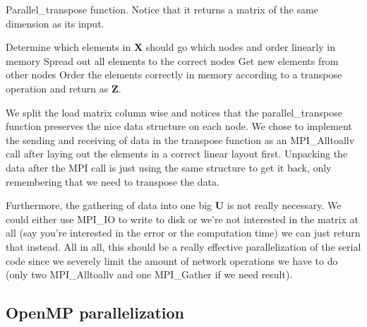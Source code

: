 \begin{algorithm}[H]
 \caption{Parallel\_transpose function. Notice that it returns a matrix of the same dimension as its input.}
 Determine which elements in $\mathbf{X}$ should go which nodes and order linearly in memory \;
 Spread out all elements to the correct nodes \;
 Get new elements from other nodes \;
 Order the elements correctly in memory according to a transpose operation and return as $\mathbf{Z}$.
 \label{code:transpose}
\end{algorithm}
We split the load matrix column wise and notices that the parallel\_transpose function preserves the nice data structure on each node. We chose to implement the sending and receiving of data in the transpose function as an MPI_Alltoallv call after laying out the elements in a correct linear layout first. Unpacking the data after the MPI call is just using the same structure to get it back, only remembering that we need to transpose the data.

Furthermore, the gathering of data into one big $\mathbf{U}$ is not really necessary. We could either use MPI\_IO to write to disk or we're not interested in the matrix at all (say you're interested in the error or the computation time) we can just return that instead. All in all, this should be a really effective parallelization of the serial code since we severely limit the amount of network operations we have to do (only two MPI_Alltoallv and one MPI_Gather if we need result).

\subsection*{OpenMP parallelization}